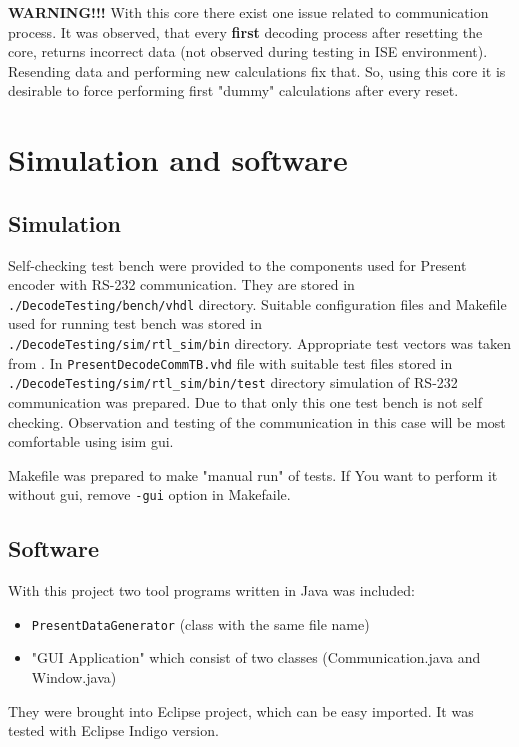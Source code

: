 \documentclass{gajewski}
\begin{document}
\textbf{WARNING!!!}
With this core there exist one issue related to communication process. It was observed, that every \textbf{first} decoding process after resetting the core, returns incorrect data (not observed during testing in ISE environment). Resending data and performing new calculations fix that. So, using this core it is desirable to force performing first "dummy" calculations after every reset.


\newpage

\section{Simulation and software}

\subsection{Simulation}

Self-checking test bench were provided to the components used for Present encoder with RS-232 communication. They are stored in \texttt{./DecodeTesting/bench/vhdl} directory. Suitable configuration files and Makefile used for running test bench was stored in \\
\texttt{./DecodeTesting/sim/rtl\_sim/bin} directory. Appropriate test vectors was taken from \cite{PRESENT}. In \texttt{PresentDecodeCommTB.vhd} file with suitable test files stored in \\
\texttt{./DecodeTesting/sim/rtl\_sim/bin/test} directory simulation of RS-232 communication was prepared. Due to that only this one test bench is not self checking. Observation and testing of the communication in this case will be most comfortable using isim gui.

Makefile was prepared to make "manual run" of tests. If You want to perform it without gui, remove \texttt{-gui} option in Makefaile.

\subsection{Software}

With this project two tool programs written in Java was included:
\begin{itemize}
    \item \texttt{PresentDataGenerator} (class with the same file name)
    \item "GUI Application" which consist of two classes (Communication.java and Window.java)
\end{itemize}
They were brought into Eclipse project, which can be easy imported. It was tested with Eclipse Indigo version.
\end{document}
